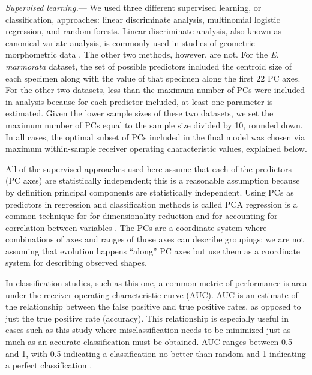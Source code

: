 \documentclass[12pt,letterpaper]{article}
\renewcommand{\subsubsection}[1]{%
\vspace{2ex}
\noindent
\textit{#1.}---}
\begin{document}
\subsubsection{Supervised learning}
We used three different supervised learning, or classification, approaches: linear discriminate analysis, multinomial logistic regression, and random forests. Linear discriminate analysis, also known as canonical variate analysis, is commonly used in studies of geometric morphometric data \citep{Zelditch2004,Claude2008,Mitteroecker2011}. The other two methods, however, are not. For the \textit{E. marmorata} dataset, the set of possible predictors included the centroid size of each specimen along with the value of that specimen along the first 22 PC axes. For the other two datasets, less than the maximum number of PCs were included in analysis because for each predictor included, at least one parameter is estimated. Given the lower sample sizes of these two datasets, we set the maximum number of PCs equal to the sample size divided by 10, rounded down. In all cases, the optimal subset of PCs included in the final model was chosen via maximum within-sample receiver operating characteristic values, explained below. 

All of the supervised approaches used here assume that each of the predictors (PC axes) are statistically independent; this is a reasonable assumption because by definition principal components are statistically independent. Using PCs as predictors in regression and classification methods is called PCA regression is a common technique for for dimensionality reduction and for accounting for correlation between variables \citep{Hastie2009}. The PCs are a coordinate system where combinations of axes and ranges of those axes can describe groupings; we are not assuming that evolution happens ``along'' PC axes \citep{Uyeda2015} but use them as a coordinate system for describing observed shapes.

In classification studies, such as this one, a common metric of performance is area under the receiver operating characteristic curve (AUC). AUC is an estimate of the relationship between the false positive and true positive rates, as opposed to just the true positive rate (accuracy). This relationship is especially useful in cases such as this study where misclassification needs to be minimized just as much as an accurate classification must be obtained. AUC ranges between 0.5 and 1, with 0.5 indicating a classification no better than random and 1 indicating a perfect classification \citep{Hastie2009}.
\end{document}
